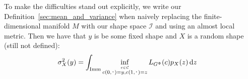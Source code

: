 \message{ !name(mainfile.tex)}\documentclass[a4,danish]{article}
\begin{document}
To make the difficulties stand out explicitly, we write our Definition~\ref{sec:mean_and_variance} when naively replacing the finite-dimensional manifold $M$ with our shape space $\mathcal{I}$ and using an almost local metric. Then we have that $y$ is be some fixed shape and $X$ is a random shape (still not defined):
\begin{align*}
  \sigma^2_X(y) &  = \int_{\I}
                  \inf_{\stackrel{c \in \mathcal{C}}{c(0,\blank)=y, c(1,\blank)=z}}
                  L_{G^\Phi}(c)p_X(z)
                  \diff z
\end{align*}



\end{document}
